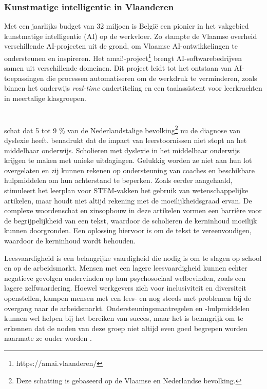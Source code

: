 \subsubsection{Kunstmatige intelligentie in Vlaanderen}
Met een jaarlijks budget van 32 miljoen is België een pionier \autocite{Crevits2022} in het vakgebied kunstmatige intelligentie (AI) op de werkvloer.  Zo stampte de Vlaamse overheid verschillende AI-projecten uit de grond, om Vlaamse AI-ontwikkelingen te ondersteunen en inspireren. Het amai!-project\footnote{https://amai.vlaanderen/}  brengt AI-softwarebedrijven samen uit verschillende domeinen. Dit project leidt tot het ontstaan van AI-toepassingen die processen automatiseren om de werkdruk te verminderen, zoals binnen het onderwijs \textit{real-time} ondertiteling en een taalassistent voor leerkrachten in meertalige klasgroepen.

\section{}%
\label{sec:probleemstelling}

\textcite{Ghesquiere2018} schat dat 5 tot 9 \% van de Nederlandstalige bevolking\footnote{Deze schatting is gebaseerd op de Vlaamse en Nederlandse bevolking.} nu de diagnose van dyslexie heeft. \textcite{Lissens2020} benadrukt dat de impact van leerstoornissen niet stopt na het middelbaar onderwijs. Scholieren met dyslexie in het middelbaar onderwijs krijgen te maken met unieke uitdagingen. Gelukkig worden ze niet aan hun lot overgelaten en zij kunnen rekenen op ondersteuning van coaches en beschikbare hulpmiddelen om hun achterstand te beperken. Zoals eerder aangehaald, stimuleert het leerplan voor STEM-vakken het gebruik van wetenschappelijke artikelen, maar houdt niet altijd rekening met de moeilijkheidsgraad ervan. De complexe woordenschat en zinsopbouw in deze artikelen vormen een barrière voor de begrijpelijkheid van een tekst, waardoor de scholieren de kerninhoud moeilijk kunnen doorgronden. Een oplossing hiervoor is om de tekst te vereenvoudigen, waardoor de kerninhoud wordt behouden.

Leesvaardigheid is een belangrijke vaardigheid die nodig is om te slagen op school en op de arbeidsmarkt. Mensen met een lagere leesvaardigheid kunnen echter negatieve gevolgen ondervinden op hun psychosociaal welbevinden, zoals een lagere zelfwaardering. Hoewel werkgevers zich voor inclusiviteit en diversiteit openstellen, kampen mensen met een lees- en  nog steeds met problemen bij de overgang naar de arbeidsmarkt. Ondersteuningsmaatregelen en -hulpmiddelen kunnen wel helpen bij het bereiken van succes, maar het is belangrijk om te erkennen dat de noden van deze groep niet altijd even goed begrepen worden naarmate ze ouder worden \autocite{Lissens2020}. %


